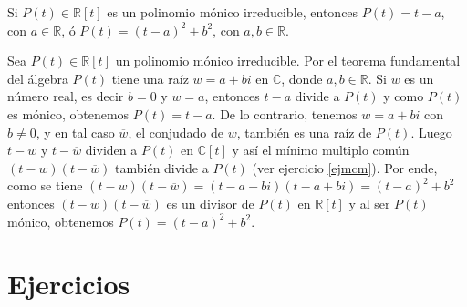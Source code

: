 \begin{teo}
Si $P(t)\in\mathbb{R}[t]$ es un polinomio m\'onico irreducible, entonces $P(t)=t-a$, con $a\in\mathbb{R}$, \'o $P(t)=(t-a)^2+b^2$, con $a,b\in\mathbb{R}$. 
\end{teo}

\dem Sea $P(t)\in\mathbb{R}[t]$ un polinomio m\'onico irreducible. Por el teorema fundamental del \'algebra $P(t)$ tiene una ra\'iz $w=a+bi$ en $\mathbb{C}$, donde $a,b\in\mathbb{R}$. Si $w$ es un n\'umero real, es decir $b=0$ y $w=a$, entonces $t-a$ divide a $P(t)$ y como $P(t)$ es m\'onico, obtenemos $P(t)=t-a$. De lo contrario, tenemos $w=a+bi$ con $b\ne 0$, y en tal caso $\overline{w}$, el conjudado de $w$, tambi\'en es una ra\'iz de $P(t)$. Luego $t-w$ y $t-\overline{w}$ dividen a $P(t)$ en $\mathbb{C}[t]$ y as\'i el m\'inimo multiplo com\'un $(t-w)(t-\overline{w})$ tambi\'en divide a $P(t)$ (ver ejercicio \ref{ejmcm}). Por ende, como se tiene $(t-w)(t-\overline{w})=(t-a-bi)(t-a+bi)=(t-a)^2+b^2$ entonces $(t-w)(t-\overline{w})$ es un divisor de $P(t)$ en $\mathbb{R}[t]$ y al ser $P(t)$ m\'onico, obtenemos $P(t)=(t-a)^2+b^2$.

\section*{Ejercicios}

